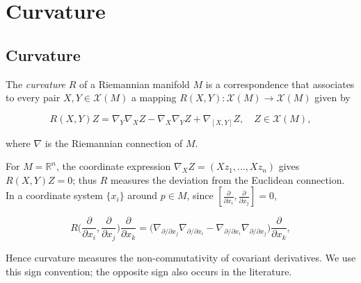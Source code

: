 \chapter{Curvature}
\label{chap:dc-curvature}

\section{Curvature}

\begin{definition}[curvature]
  \label{def:dc-ch4-2-1}
  \leanok
  The \emph{curvature} $R$ of a Riemannian manifold $M$ is a correspondence that
  associates to every pair $X,Y\in\mathcal{X}(M)$ a mapping
  $R(X,Y):\mathcal{X}(M)\to\mathcal{X}(M)$ given by
  
  $$
  R(X,Y)Z=\nabla_Y\nabla_X Z-\nabla_X\nabla_Y Z+\nabla_{[X,Y]}Z,\quad Z\in\mathcal{X}(M),
  $$
  
  where $\nabla$ is the Riemannian connection of $M$.
  
  For $M=\mathbb{R}^n$, the coordinate expression
  $\nabla_X Z=(Xz_1,\dots,Xz_n)$ gives $R(X,Y)Z=0$; thus $R$ measures the
  deviation from the Euclidean connection.
  In a coordinate system $\{x_i\}$ around $p\in M$, since
  $[\frac{\partial}{\partial x_i},\frac{\partial}{\partial x_j}]=0$,
  
  $$
  R\Big(\frac{\partial}{\partial x_i},\frac{\partial}{\partial x_j}\Big)\frac{\partial}{\partial x_k}=\Big(\nabla_{\partial/\partial x_j}\nabla_{\partial/\partial x_i}-\nabla_{\partial/\partial x_i}\nabla_{\partial/\partial x_j}\Big)\frac{\partial}{\partial x_k},
  $$
  
  Hence curvature measures the non-commutativity of covariant derivatives. We use
  this sign convention; the opposite sign also occurs in the literature.
\end{definition}

